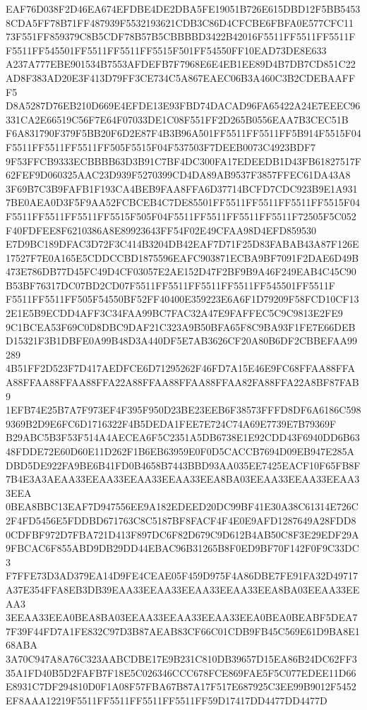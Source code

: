 \documentclass[UTF8,fontset=fandol,zihao=-4,a4paper]{ctexart}
\begin{document}
{{EAF76D038F2D46EA674EFDBE4DE2DBA5FE19051B726E615DBD12F5BB54538CDA5FF78B71FF487939F5532193621CDB3C86D4CFCBE6FBFA0E577CFC11
73F551FF859379C8B5CDF78B57B5CBBBBD3422B42016F5511FF5511FF5511FF5511FF545501FF5511FF5511FF5515F501FF54550FF10EAD73DE8E633
A237A777EBE901534B7553AFDEFB7F7968E6E4EB1EE89D4B7DB7CD851C22AD8F383AD20E3F413D79FF3CE734C5A867EAEC06B3A460C3B2CDEBAAFFF5
D8A5287D76EB210D669E4EFDE13E93FBD74DACAD96FA65422A24E7EEEC96331CA2E66519C56F7E64F07033DE1C08F551FF2D265B0556EAA7B3CEC51B
F6A831790F379F5BB20F6D2E87F4B3B96A501FF5511FF5511FF5B914F5515F04F5511FF5511FF5511FF505F5515F04F537503F7DEEB0073C4923BDF7
9F53FFCB9333ECBBBB63D3B91C7BF4DC300FA17EDEEDB1D43FB61827517F62FEF9D060325AAC23D939F5270399CD4DA89AB9537F3857FFEC61DA43A8
3F69B7C3B9FAFB1F193CA4BEB9FAA8FFA6D37714BCFD7CDC923B9E1A9317BE0AEA0D3F5F9AA52FCBCEB4C7DE85501FF5511FF5511FF5511FF5515F04
F5511FF5511FF5511FF5515F505F04F5511FF5511FF5511FF5511F72505F5C052F40FDFEE8F6210386A8E89923643FF54F02E49CFAA98D4EFD859530
E7D9BC189DFAC3D72F3C414B3204DB42EAF7D71F25D83FABAB43A87F126E17527F7E0A165E5CDDCCBD1875596EAFC903871ECBA9BF7091F2DAE6D49B
473E786DB77D45FC49D4CF03057E2AE152D47F2BF9B9A46F249EAB4C45C90B53BF76317DC07BD2CD07F5511FF5511FF5511FF5511FF545501FF5511F
F5511FF5511FF505F54550BF52FF40400E359223E6A6F1D79209F58FCD10CF132E1E5B9ECDD4AFF3C34FAA99BC7FAC32A47E9FAFFEC5C9C9813E2FE9
9C1BCEA53F69C0D8DBC9DAF21C323A9B50BFA65F8C9BA93F1FE7E66DEBD15321F3B1DBFE0A99B48D3A440DF5E7AB3626CF20A80B6DF2CBBEFAA99289
4B51FF2D523F7D417AEDFCE6D71295262F46FD7A15E46E9FC68FFAA88FFAA88FFAA88FFAA88FFA22A88FFAA88FFAA88FFAA82FA88FFA22A8BF87FAB9
1EFB74E25B7A7F973EF4F395F950D23BE23EEB6F38573FFFD8DF6A6186C5989369B2D9E6FC6D1716322F4B5DEDA1FEE7E724C74A69E7739E7B79369F
B29ABC5B3F53F514A4AECEA6F5C2351A5DB6738E1E92CDD43F6940DD6B6348FDDE72E60D60E11D262F1B6EB63959E0F0D5CACCB7694D09EB947E285A
DBD5DE922FA9BE6B41FD0B4658B7443BBD93AA035EE7425EACF10F65FB8F7B4E3A3AEAA33EEAA33EEAA33EEAA33EEA8BA03EEAA33EEAA33EEAA33EEA
0BEA8BBC13EAF7D947556EE9A182EDEED20DC99BF41E30A38C61314E726C2F4FD5456E5FDDBD671763C8C5187BF8FACF4F4E0E9AFD1287649A28FDD8
0CDFBF972D7FBA721D413F897DC6F82D679C9D612B4AB50C8F3E29EDF29A9FBCAC6F855ABD9DB29DD44EBAC96B31265B8F0ED9BF70F142F0F9C33DC3
F7FFE73D3AD379EA14D9FE4CEAE05F459D975F4A86DBE7FE91FA32D49717A37E354FFA8EB3DB39EAA33EEAA33EEAA33EEAA33EEA8BA03EEAA33EEAA3
3EEAA33EEA0BEA8BA03EEAA33EEAA33EEAA33EEA0BEA0BEABF5DEA77F39F44FD7A1FE832C97D3B87AEAB83CF66C01CDB9FB45C569E61D9BA8E168ABA
3A70C947A8A76C323AABCDBE17E9B231C810DB39657D15EA86B24DC62FF335A1FD40B5D2FAFB7F18E5C026346CCC678FCE869FAE5F5C077EDEE11D66
E8931C7DF294810D0F1A08F57FBA67B87A17F517E687925C3EE99B9012F5452EF8AAA12219F5511FF5511FF5511FF5511FF59D17417DD4477DD4477D
}}
\end{document}
